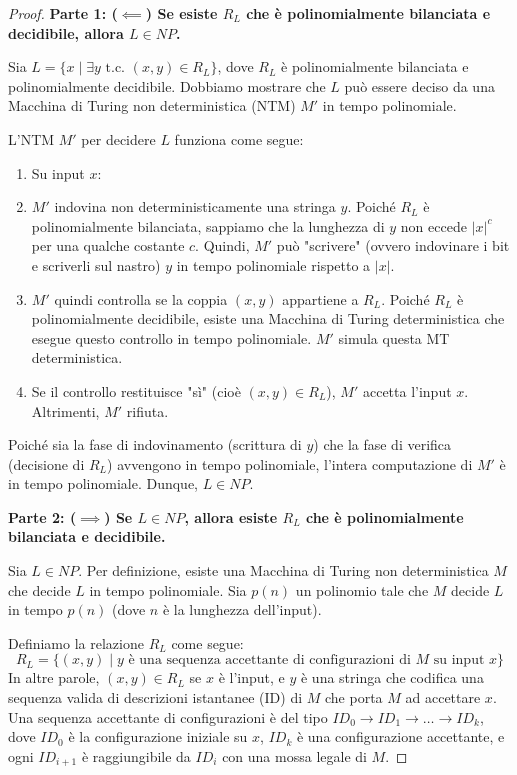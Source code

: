 \documentclass[a4paper, 11pt]{book} %
\theoremstyle{definition}
\begin{document}
\begin{proof}
\textbf{Parte 1: ($\impliedby$) Se esiste $R_L$ che è polinomialmente bilanciata e decidibile, allora $L \in NP$.}

Sia $L = \{x \mid \exists y \text{ t.c. } (x, y) \in R_L\}$, dove $R_L$ è polinomialmente bilanciata e polinomialmente decidibile.
Dobbiamo mostrare che $L$ può essere deciso da una Macchina di Turing non deterministica (NTM) $M'$ in tempo polinomiale.

L'NTM $M'$ per decidere $L$ funziona come segue:
\begin{enumerate}
    \item Su input $x$:
    \item $M'$ indovina non deterministicamente una stringa $y$. Poiché $R_L$ è polinomialmente bilanciata, sappiamo che la lunghezza di $y$ non eccede $|x|^c$ per una qualche costante $c$. Quindi, $M'$ può "scrivere" (ovvero indovinare i bit e scriverli sul nastro) $y$ in tempo polinomiale rispetto a $|x|$.
    \item $M'$ quindi controlla se la coppia $(x, y)$ appartiene a $R_L$. Poiché $R_L$ è polinomialmente decidibile, esiste una Macchina di Turing deterministica che esegue questo controllo in tempo polinomiale. $M'$ simula questa MT deterministica.
    \item Se il controllo restituisce "sì" (cioè $(x, y) \in R_L$), $M'$ accetta l'input $x$. Altrimenti, $M'$ rifiuta.
\end{enumerate}
Poiché sia la fase di indovinamento (scrittura di $y$) che la fase di verifica (decisione di $R_L$) avvengono in tempo polinomiale, l'intera computazione di $M'$ è in tempo polinomiale. Dunque, $L \in NP$.

\textbf{Parte 2: ($\implies$) Se $L \in NP$, allora esiste $R_L$ che è polinomialmente bilanciata e decidibile.}

Sia $L \in NP$. Per definizione, esiste una Macchina di Turing non deterministica $M$ che decide $L$ in tempo polinomiale. Sia $p(n)$ un polinomio tale che $M$ decide $L$ in tempo $p(n)$ (dove $n$ è la lunghezza dell'input).

Definiamo la relazione $R_L$ come segue:
\[ R_L = \{(x, y) \mid y \text{ è una sequenza accettante di configurazioni di } M \text{ su input } x \} \]
In altre parole, $(x, y) \in R_L$ se $x$ è l'input, e $y$ è una stringa che codifica una sequenza valida di descrizioni istantanee (ID) di $M$ che porta $M$ ad accettare $x$. Una sequenza accettante di configurazioni è del tipo $ID_0 \to ID_1 \to \dots \to ID_k$, dove $ID_0$ è la configurazione iniziale su $x$, $ID_k$ è una configurazione accettante, e ogni $ID_{i+1}$ è raggiungibile da $ID_i$ con una mossa legale di $M$.


\end{proof}
\end{document}
